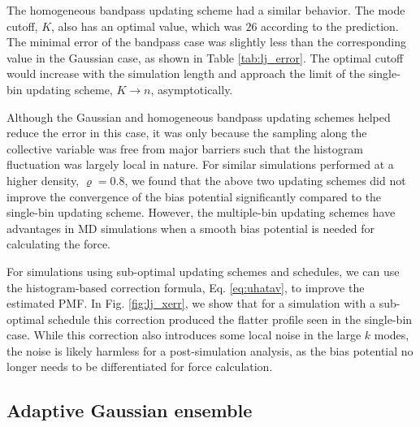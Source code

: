 \documentclass[preprint, superscriptaddress, floatfix]{revtex4-1}
\begin{document}
The homogeneous bandpass updating scheme
had a similar behavior.
%
The mode cutoff, $K$, also has an optimal value,
which was $26$ according to the prediction.
%
The minimal error of the bandpass case
was slightly less than the corresponding value
in the Gaussian case, as shown in Table \ref{tab:lj_error}.
%
The optimal cutoff would increase with the simulation length
and approach the limit of the single-bin updating scheme, $K \to n$,
asymptotically.


Although the Gaussian and homogeneous bandpass updating schemes
helped reduce the error in this case,
it was only because
the sampling along the collective variable
was free from major barriers
such that the histogram fluctuation was largely local in nature.
%
For similar simulations performed at a higher density, $\varrho = 0.8$,
we found that the above two updating schemes
did not improve the convergence of the bias potential significantly
compared to the single-bin updating scheme.
%
However,
the multiple-bin updating schemes have advantages in MD simulations
when a smooth bias potential is needed for calculating the force.

For simulations using sub-optimal
updating schemes and schedules,
we can use the histogram-based correction formula,
Eq. \eqref{eq:uhatav},
to improve the estimated PMF.
%
In Fig. \ref{fig:lj_xerr},
we show that
for a simulation with a sub-optimal schedule
this correction produced
the flatter profile seen in the single-bin case.
%
While this correction also introduces
some local noise in the large $k$ modes,
the noise is likely harmless
for a post-simulation analysis, as
the bias potential no longer needs to be differentiated
for force calculation.
%





\subsection{\label{sec:potts}
Adaptive Gaussian ensemble}
\end{document}
